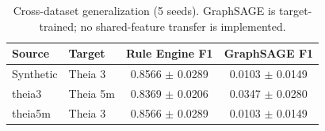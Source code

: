 \begin{table}[t]
\centering
\small
\caption{Cross-dataset generalization (5 seeds). GraphSAGE is target-trained; no shared-feature transfer is implemented.}
\label{tab:generalization}
\begin{tabular}{llcc}
\toprule
Source & Target & Rule Engine F1 & GraphSAGE F1 \\
\midrule
Synthetic & Theia 3 & 0.8566 $\pm$ 0.0289 & 0.0103 $\pm$ 0.0149 \\
theia3 & Theia 5m & 0.8369 $\pm$ 0.0206 & 0.0347 $\pm$ 0.0280 \\
theia5m & Theia 3 & 0.8566 $\pm$ 0.0289 & 0.0103 $\pm$ 0.0149 \\
\bottomrule
\end{tabular}
\end{table}

